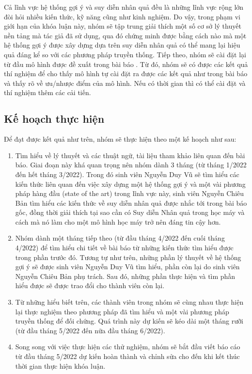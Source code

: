 \documentclass{article}[14pt]
\begin{document}
{    Cả lĩnh vực hệ thống gợi ý và suy diễn nhân quả đều là những lĩnh vực rộng lớn đòi hỏi nhiều kiến thức, kỹ năng cũng như kinh nghiệm. Do vậy, trong phạm vi giới hạn của khóa luận này, nhóm sẽ tập trung giải thích một số cơ sở lý thuyết nền tảng mà tác giả đã sử dụng, qua đó chứng minh được bằng cách nào mà một hệ thống gợi ý được xây dựng dựa trên suy diễn nhân quả có thể mang lại hiệu quả đáng kể so với các phương pháp truyền thống. Tiếp theo, nhóm sẽ cài đặt lại từ đầu mô hình được đề xuất trong bài báo \cite{cause}. Từ đó, nhóm sẽ có được các kết quả thí nghiệm để cho thấy mô hình tự cài đặt ra được các kết quả như trong bài báo và thấy rõ về ưu/nhược điểm của mô hình. Nếu có thời gian thì có thể cài đặt và thí nghiệm thêm các cải tiến.
   
    
    \subsection{Kế hoạch thực hiện}
        
    Để đạt được kết quả như trên, nhóm sẽ thực hiện theo một kế hoạch như sau:
    \begin{enumerate}
        \item Tìm hiểu về lý thuyết và các thuật ngữ, tài liệu tham khảo liên quan đến bài báo. Giai đoạn này khá quan trọng nên nhóm dành 3 tháng (từ tháng 1/2022 đến hết tháng 3/2022). Trong đó sinh viên Nguyễn Duy Vũ sẽ tìm hiểu các kiến thức liên quan đến việc xây dựng một hệ thống gợi ý  và một vài phương pháp hàng đầu (state of the art) trong lĩnh vực này, sinh viên Nguyễn Chiêu Bản tìm hiểu các kiến thức về suy diễn nhân quả được nhắc tới trong bài báo gốc, đồng thời giải thích tại sao cần có Suy diễn Nhân quả trong học máy và cách mà nó làm cho một mô hình học máy trở nên đáng tin cậy hơn.
        \item Nhóm dành một tháng tiếp theo (từ đầu tháng 4/2022 đến cuối tháng 4/2022) để tìm hiểu chi tiết về bài báo từ những kiến thức tìm hiểu được trong phần trước đó. Tương tự như trên, những phần lý thuyết về hệ thống gợi ý sẽ được sinh viên Nguyễn Duy Vũ tìm hiểu, phần còn lại do sinh viên Nguyễn Chiêu Bản phụ trách. Sau đó, những phần thực hiện và tìm phần hiểu được sẽ được trao đổi  cho thành viên còn lại. 
        \item Từ những hiểu biết trên, các thành viên trong nhóm sẽ cùng nhau thực hiện lại thực nghiệm theo phương pháp đã tìm hiểu và một vài phương pháp truyền thống để đối chứng. Quá trình này dự kiến sẽ kéo dài một tháng rưỡi (từ đầu tháng 5/2022 đến nữa đầu tháng 6/2022).
        \item Song song với việc thực hiện các thử nghiệm, nhóm sẽ bắt đầu viết báo cáo từ đầu tháng 5/2022 dự kiến hoàn thành và chỉnh sửa cho đến khi kết thúc thời gian thực hiện khóa luận.
        \end{enumerate}
    

    }
    
    
    \nocite{*}
\end{document}
